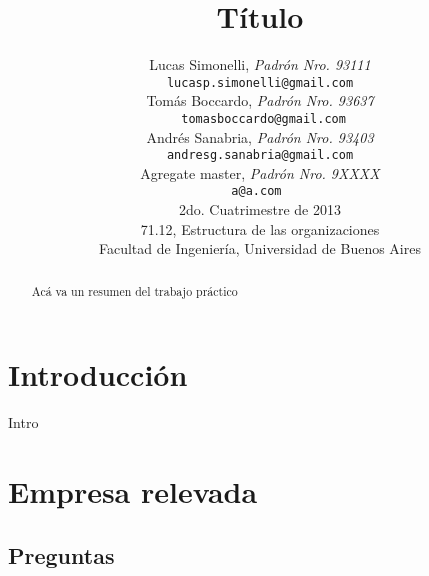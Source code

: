 \documentclass[a4paper,10pt]{article}
\title{		\textbf{Título}}
\author{	Lucas Simonelli, \textit{Padrón Nro. 93111}                     \\
            \texttt{ lucasp.simonelli@gmail.com }                                              \\[2.5ex]
            Tomás Boccardo, \textit{Padrón Nro. 93637}                     \\
            \texttt{ tomasboccardo@gmail.com}                                              \\[2.5ex]
            Andrés Sanabria, \textit{Padrón Nro. 93403}                     \\
            \texttt{ andresg.sanabria@gmail.com  }                                              \\[2.5ex]
             Agregate master, \textit{Padrón Nro. 9XXXX}                     \\
            \texttt{a@a.com  }                                              \\[2.5ex]
            \normalsize{2do. Cuatrimestre de 2013}                                      \\
            \normalsize{71.12, Estructura de las organizaciones}  \\
            \normalsize{Facultad de Ingeniería, Universidad de Buenos Aires}            \\
       }
\date{}
\begin{document}
\maketitle
\thispagestyle{empty}   %



\begin{abstract}
Acá va un resumen del trabajo práctico
\end{abstract}

\newpage
\tableofcontents
\newpage
\section{Introducción}
Intro
\section{Empresa relevada}
	\subsection{Preguntas}
\end{document}
